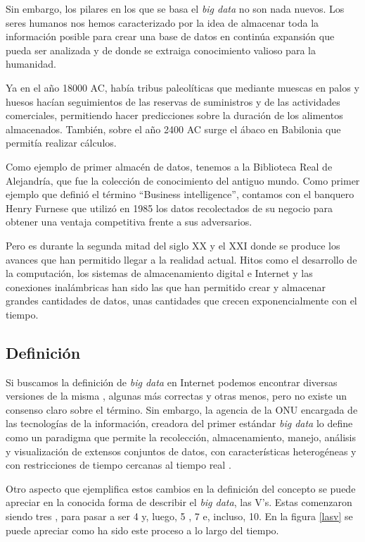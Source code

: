 Sin embargo, los pilares en los que se basa el \textit{big data} no son nada nuevos. Los seres humanos nos hemos caracterizado por la idea de almacenar toda la información posible para crear una base de datos en continúa expansión que pueda ser analizada y de donde se extraiga conocimiento valioso para la humanidad.

Ya en el año 18000 \gls{AC}, había tribus paleolíticas que mediante muescas en palos y huesos hacían seguimientos de las reservas de suministros y de las actividades comerciales, permitiendo hacer predicciones sobre la duración de los alimentos almacenados. También, sobre el año 2400 \gls{AC} surge el ábaco en Babilonia que permitía realizar cálculos.

Como ejemplo de primer almacén de datos, tenemos a la Biblioteca Real de Alejandría, que fue la colección de conocimiento del antiguo mundo. Como primer ejemplo que definió el término ``Business intelligence'', contamos con el banquero Henry Furnese que utilizó en 1985 los datos recolectados de su negocio para obtener una ventaja competitiva frente a sus adversarios.

Pero es durante la segunda mitad del siglo XX y el XXI donde se produce los avances que han permitido llegar a la realidad actual. Hitos como el desarrollo de la computación, los sistemas de almacenamiento digital e Internet y las conexiones inalámbricas han sido las que han permitido crear y almacenar grandes cantidades de datos, unas cantidades que crecen exponencialmente con el tiempo.

\subsection{Definición \label{defBigData}}
Si buscamos la definición de \textit{big data} en Internet podemos encontrar diversas versiones de la misma \cite{ayuso}, algunas más correctas y otras menos, pero no existe un consenso claro sobre el término. Sin embargo, la agencia de la \gls{ONU} encargada de las tecnologías de la  información, creadora del primer estándar \textit{big data} lo define como un paradigma que permite la recolección, almacenamiento, manejo, análisis y visualización de extensos conjuntos de datos, con características heterogéneas y con restricciones de tiempo cercanas al tiempo real \cite{estandar}. 

Otro aspecto que ejemplifica estos cambios en la definición del concepto se puede apreciar en la conocida forma de describir el \textit{big data}, las V's. Estas comenzaron siendo tres \cite{ayuso}, para pasar a ser 4 \cite{4v} y, luego, 5 \cite{monse}, 7 \cite{soriano} e, incluso, 10. En la figura \ref{lasv} se puede apreciar como ha sido este proceso a lo largo del tiempo.

